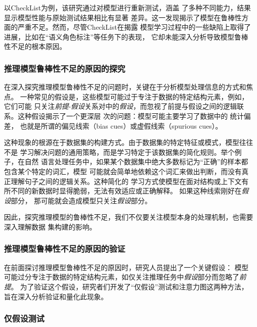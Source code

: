 以CheckList\cite{Marco2020acl}为例，该研究通过对模型进行重新测试，涵盖
了多种不同能力，结果显示模型性能与原始测试结果相比有显著
差异。这一发现揭示了模型在鲁棒性方面的严重不足。然而，尽管CheckList在揭露
模型学习过程中的一些缺陷上取得了进展，比如在``语义角色标注''等任务下的表现，
它却未能深入分析导致模型鲁棒性不足的根本原因。

\subsubsection{推理模型鲁棒性不足的原因的探究}

在深入探究推理模型鲁棒性不足的问题时，关键在于分析模型处理信息的方式和焦点。
一种常见的假设是，这些模型可能过于专注于数据的特定结构元素，例如，它们可能
只关注\textit{前提}-\textit{假设}关系对中的\textit{假设}，而忽视了前提与假设之间的逻辑联系。这种假设揭示了一个更深层
次的问题：模型可能主要学习了数据中的
统计偏差\cite{naik2018stress,mccoy2019right,schuster2019towards,nie2020adversarial}，
也就是所谓的偏见线索（bias cues）或虚假线索（spurious cues）。

这种现象的根源在于数据集的构建方式。由于数据集的特定特征或模式，模型往往不是
学习解决问题的通用策略，而是学习特定于该数据集的简化规则。举个例子，在自然
语言处理任务中，如果某个数据集中绝大多数标记为``正确''的样本都包含某个特定的词汇，模型
可能就会简单地依赖这个词汇来做出判断，而没有真正理解句子之间的逻辑关系。这种简化的
学习方式使模型在面对结构或上下文有所不同的新数据时显得脆弱，无法有效适应或正确解释。
如果这种线索刚好在\textit{假设}部分，
那可能就会造成模型只关注\textit{假设}部分。

因此，探究推理模型的鲁棒性不足，我们不仅要关注模型本身的处理机制，也需要深入理解数据
集构建的影响。


\subsubsection{推理模型鲁棒性不足的原因的验证}

在前面探讨推理模型鲁棒性不足的原因时，研究人员提出了一个关键假设：
模型可能过分专注于数据的特定结构元素，如仅关注推理任务中\textit{假设}部分而忽略了\textit{前提}。
为了验证这个假设，研究者们开发了``仅假设''测试\cite{gururangan2018annotation}和注意力图\cite{vig2019multiscale}这两种方法，
旨在深入分析验证和量化此现象。

\subsubsection*{仅假设测试}

